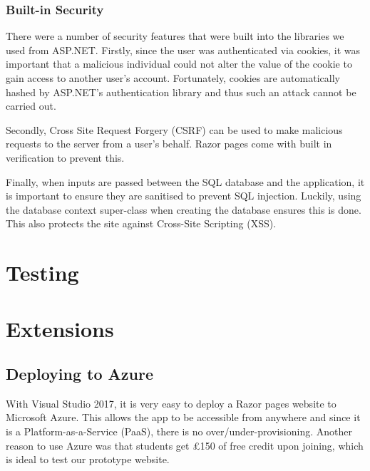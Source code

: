 \documentclass{article}
\begin{document}
        \subsubsection{Built-in Security}
            \par
                There were a number of security features that were built into the libraries we used from ASP.NET.
                Firstly, since the user was authenticated via cookies, it was important that a malicious individual could not alter the value of the cookie to gain access to another user’s account.
                Fortunately, cookies are automatically hashed by ASP.NET’s authentication library and thus such an attack cannot be carried out.

            \par
                Secondly, Cross Site Request Forgery (CSRF) can be used to make malicious requests to the server from a user’s behalf.
                Razor pages come with built in verification to prevent this.

            \par
                Finally, when inputs are passed between the SQL database and the application, it is important to ensure they are sanitised to prevent SQL injection.
                Luckily, using the database context super-class when creating the database ensures this is done.
                This also protects the site against Cross-Site Scripting (XSS).


\section{Testing}

\section{Extensions}
    \subsection{Deploying to Azure}
        \par
            With Visual Studio 2017, it is very easy to deploy a Razor pages website to Microsoft Azure.
            This allows the app to be accessible from anywhere and since it is a Platform-as-a-Service (PaaS), there is no over/under-provisioning.
            Another reason to use Azure was that students get £150 of free credit upon joining, which is ideal to test our prototype website.
\end{document}
